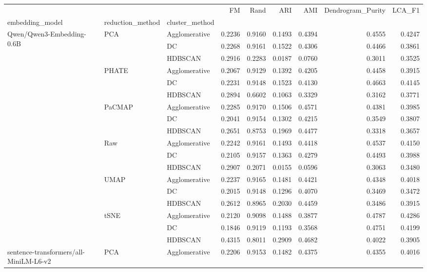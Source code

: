\begin{tabular}{lllrrrrrr}
\toprule
 &  &  & FM & Rand & ARI & AMI & Dendrogram_Purity & LCA_F1 \\
embedding_model & reduction_method & cluster_method &  &  &  &  &  &  \\
\midrule
\multirow[t]{18}{*}{Qwen/Qwen3-Embedding-0.6B} & \multirow[t]{3}{*}{PCA} & Agglomerative & 0.2236 & 0.9160 & 0.1493 & 0.4394 & 0.4555 & 0.4247 \\
 &  & DC & 0.2268 & 0.9161 & 0.1522 & 0.4306 & 0.4466 & 0.3861 \\
 &  & HDBSCAN & 0.2916 & 0.2283 & 0.0187 & 0.0760 & 0.3011 & 0.3525 \\
\cline{2-9}
 & \multirow[t]{3}{*}{PHATE} & Agglomerative & 0.2067 & 0.9129 & 0.1392 & 0.4205 & 0.4458 & 0.3915 \\
 &  & DC & 0.2231 & 0.9148 & 0.1523 & 0.4130 & 0.4663 & 0.4145 \\
 &  & HDBSCAN & 0.2894 & 0.6602 & 0.1063 & 0.3329 & 0.3162 & 0.3771 \\
\cline{2-9}
 & \multirow[t]{3}{*}{PaCMAP} & Agglomerative & 0.2285 & 0.9170 & 0.1506 & 0.4571 & 0.4381 & 0.3985 \\
 &  & DC & 0.2041 & 0.9154 & 0.1302 & 0.4215 & 0.3549 & 0.3807 \\
 &  & HDBSCAN & 0.2651 & 0.8753 & 0.1969 & 0.4477 & 0.3318 & 0.3657 \\
\cline{2-9}
 & \multirow[t]{3}{*}{Raw} & Agglomerative & 0.2242 & 0.9161 & 0.1493 & 0.4418 & 0.4537 & 0.4150 \\
 &  & DC & 0.2105 & 0.9157 & 0.1363 & 0.4279 & 0.4493 & 0.3988 \\
 &  & HDBSCAN & 0.2907 & 0.2071 & 0.0155 & 0.0596 & 0.3063 & 0.3480 \\
\cline{2-9}
 & \multirow[t]{3}{*}{UMAP} & Agglomerative & 0.2237 & 0.9165 & 0.1481 & 0.4421 & 0.4348 & 0.4018 \\
 &  & DC & 0.2015 & 0.9148 & 0.1296 & 0.4070 & 0.3469 & 0.3472 \\
 &  & HDBSCAN & 0.2612 & 0.8965 & 0.2030 & 0.4459 & 0.3486 & 0.3915 \\
\cline{2-9}
 & \multirow[t]{3}{*}{tSNE} & Agglomerative & 0.2120 & 0.9098 & 0.1488 & 0.3877 & 0.4787 & 0.4286 \\
 &  & DC & 0.1846 & 0.9119 & 0.1193 & 0.3568 & 0.4751 & 0.4199 \\
 &  & HDBSCAN & 0.4315 & 0.8011 & 0.2909 & 0.4682 & 0.4022 & 0.3905 \\
\cline{1-9} \cline{2-9}
\multirow[t]{18}{*}{sentence-transformers/all-MiniLM-L6-v2} & \multirow[t]{3}{*}{PCA} & Agglomerative & 0.2206 & 0.9153 & 0.1482 & 0.4375 & 0.4355 & 0.4016 \\

\end{tabular}
